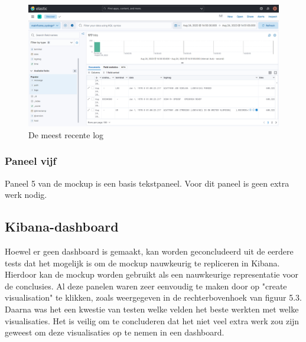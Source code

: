 \begin{figure}[h]
    \centering
    \includegraphics[width=0.50\linewidth]{Kibana_recent_log.png}
    \caption{De meest recente log}
    \label{fig:De meest recente log}
\end{figure}

\subsubsection{Paneel vijf}
Paneel 5 van de mockup is een basis tekstpaneel. Voor dit paneel is geen extra werk nodig.

\subsection{Kibana-dashboard}
Hoewel er geen dashboard is gemaakt, kan worden geconcludeerd uit de eerdere tests dat het mogelijk is om de mockup nauwkeurig te repliceren in Kibana. Hierdoor kan de mockup worden gebruikt als een nauwkeurige representatie voor de conclusies. Al deze panelen waren zeer eenvoudig te maken door op "create visualisation" te klikken, zoals weergegeven in de rechterbovenhoek van figuur 5.3. Daarna was het een kwestie van testen welke velden het beste werkten met welke visualisaties. Het is veilig om te concluderen dat het niet veel extra werk zou zijn geweest om deze visualisaties op te nemen in een dashboard.
